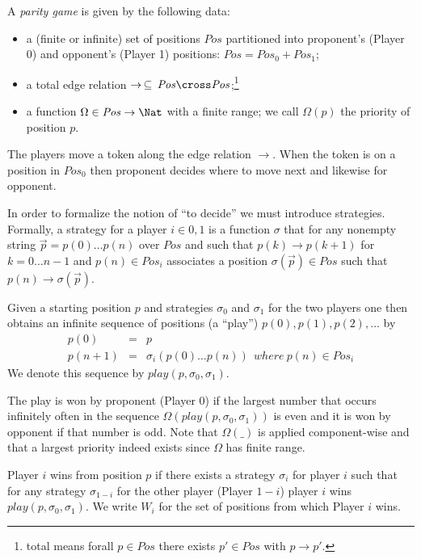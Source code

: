 
\newcommand{\Pos}{\mathit{Pos}}

A \emph{parity game} is given by the following data:
  \begin{itemize}
  \item a (finite or infinite) set of positions $\Pos$
           partitioned into proponent's (Player 0) and opponent's (Player 1) positions:
           $\Pos = \Pos_0 + \Pos_1$\@;
   \item a total edge relation $\rightarrow   \,\subseteq\, \Pos \cross \Pos$\@;\footnote{ 
             total means forall $p\in \Pos$ there exists $p' \in\Pos$ with  $p \rightarrow p'$\@.}
    \item a function $\Omega \in \Pos \rightarrow \Nat$ with a finite range; 
            we call $\Omega(p)$ the priority of position $p$\@. 
  \end{itemize}
The players move a token along the edge relation $\rightarrow$\@. When the
token is on a position in $\Pos_0$ then proponent decides where to move
next and likewise for opponent.

In order to formalize the notion of ``to decide'' we must introduce
strategies.  Formally, a strategy for a player $i\in {0,1}$ is a
function $\sigma$ that for any nonempty string $\vec p =
p(0)\ldots p(n)$ over $\Pos$ and such that $p(k)\rightarrow p(k+1)$
for $k=0 \ldots n-1$ and $p(n)\in Pos_i$ associates a position
$\sigma(\vec p) \in\Pos$ such that $p(n) \rightarrow
\sigma(\vec p)$\@.

Given a starting position $p$ and strategies $\sigma_0$ and $\sigma_1$ for
the two players one then obtains an infinite sequence of positions (a
``play'') $p(0),p(1),p(2),\ldots$  by 
\begin{eqnarray*}
   p(0) &=& p \\
p(n+1) &=& \sigma_i(p(0) \ldots p(n))   ~~\mathit{where}~ p(n) \in\Pos_i
\end{eqnarray*}
We denote this sequence by $\mathit{play}(p,\sigma_0,\sigma_1)$\@.  

The play is won by proponent (Player 0) if the largest number that
occurs infinitely often in the sequence $\Omega(\mathit{play}(p,\sigma_0,\sigma_1))$
is even and it is won by opponent if that number is odd. Note that
$\Omega(\_)$ is applied component-wise and that a largest priority indeed
exists since $\Omega$ has finite range.

Player $i$ wins from position $p$ if there exists a strategy $\sigma_i$ for
player $i$ such that for any strategy $\sigma_{1-i}$ for the other player
(Player $1-i$) player $i$ wins $\mathit{play}(p,\sigma_0,\sigma_1)$\@.  
We write $W_i$ for the set of positions from which Player $i$ wins.

